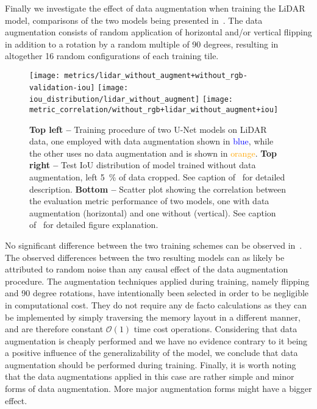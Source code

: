 
Finally we investigate the effect of data augmentation when training the LiDAR model, comparisons of the two models being presented in~.
The data augmentation consists of random application of horizontal and/or vertical flipping in addition to a rotation by a random multiple of 90 degrees, resulting in altogether 16 random configurations of each training tile.

\begin{figure}[H]
  \centering
  \texttt{[image: metrics/lidar\_without\_augment+without\_rgb-validation-iou]}
  \texttt{[image: iou\_distribution/lidar\_without\_augment]}
  \texttt{[image: metric\_correlation/without\_rgb+lidar\_without\_augment+iou]}
  \hspace{-0.9em}
  \caption{%
    \textbf{Top left --} Training procedure of two U-Net models on LiDAR data, one employed with data augmentation shown in \textcolor{blue}{blue}, while the other uses no data augmentation and is shown in \textcolor{orange}{orange}.
    \textbf{Top right --} Test IoU distribution of model trained without data augmentation, left \SI{5}{\percent} of data cropped.
    See caption of~ for detailed description.
    \textbf{Bottom --} Scatter plot showing the correlation between the evaluation metric performance of two models, one with data augmentation (horizontal) and one without (vertical).
    See caption of~ for detailed figure explanation.
  }%
  \label{fig:data-augmentation-experiment}
\end{figure}

No significant difference between the two training schemes can be observed in~.
The observed differences between the two resulting models can as likely be attributed to random noise than any causal effect of the data augmentation procedure.
The augmentation techniques applied during training, namely flipping and 90 degree rotations, have intentionally been selected in order to be negligible in computational cost.
They do not require any de facto calculations as they can be implemented by simply traversing the memory layout in a different manner, and are therefore constant $\mathcal{O}(1)$ time cost operations.
Considering that data augmentation is cheaply performed and we have no evidence contrary to it being a positive influence of the generalizability of the model, we conclude that data augmentation should be performed during training.
Finally, it is worth noting that the data augmentations applied in this case are rather simple and minor forms of data augmentation.
More major augmentation forms might have a bigger effect.


